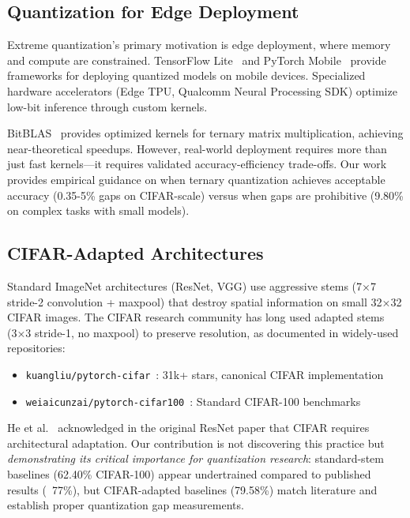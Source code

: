 \subsection{Quantization for Edge Deployment}

Extreme quantization's primary motivation is edge deployment, where memory and compute are constrained. TensorFlow Lite~\cite{tflite} and PyTorch Mobile~\cite{pytorch_mobile} provide frameworks for deploying quantized models on mobile devices. Specialized hardware accelerators (Edge TPU, Qualcomm Neural Processing SDK) optimize low-bit inference through custom kernels.

BitBLAS~\cite{bitblas} provides optimized kernels for ternary matrix multiplication, achieving near-theoretical speedups. However, real-world deployment requires more than just fast kernels—it requires validated accuracy-efficiency trade-offs. Our work provides empirical guidance on when ternary quantization achieves acceptable accuracy (0.35-5\% gaps on CIFAR-scale) versus when gaps are prohibitive (9.80\% on complex tasks with small models).

\subsection{CIFAR-Adapted Architectures}

Standard ImageNet architectures (ResNet, VGG) use aggressive stems (7×7 stride-2 convolution + maxpool) that destroy spatial information on small 32×32 CIFAR images. The CIFAR research community has long used adapted stems (3×3 stride-1, no maxpool) to preserve resolution, as documented in widely-used repositories:
\begin{itemize}
    \item \texttt{kuangliu/pytorch-cifar}~\cite{pytorch_cifar_kuangliu}: 31k+ stars, canonical CIFAR implementation
    \item \texttt{weiaicunzai/pytorch-cifar100}~\cite{pytorch_cifar100_weiaicunzai}: Standard CIFAR-100 benchmarks
\end{itemize}

He et al.~\cite{he2016resnet} acknowledged in the original ResNet paper that CIFAR requires architectural adaptation. Our contribution is not discovering this practice but \textit{demonstrating its critical importance for quantization research}: standard-stem baselines (62.40\% CIFAR-100) appear undertrained compared to published results (~77\%), but CIFAR-adapted baselines (79.58\%) match literature and establish proper quantization gap measurements.

